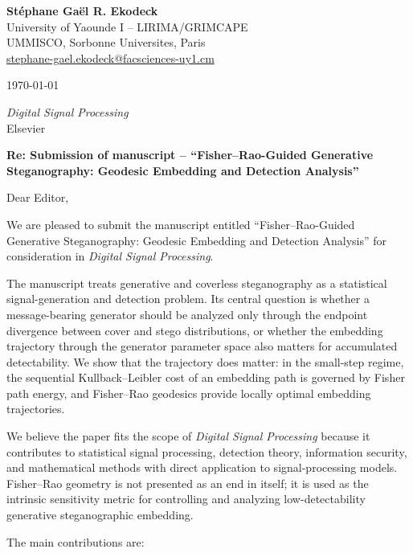\documentclass[12pt,a4paper]{article}
\begin{document}
\raggedright

\textbf{St\'ephane Ga\"el R. Ekodeck}\\
University of Yaounde I -- LIRIMA/GRIMCAPE\\
UMMISCO, Sorbonne Universites, Paris\\
\href{mailto:stephane-gael.ekodeck@facsciences-uy1.cm}
     {stephane-gael.ekodeck@facsciences-uy1.cm}

\bigskip
\today

\bigskip

\textit{Digital Signal Processing}\\
Elsevier

\bigskip

\textbf{Re: Submission of manuscript --
``Fisher--Rao-Guided Generative Steganography: Geodesic Embedding and Detection Analysis''}

\bigskip

Dear Editor,

We are pleased to submit the manuscript entitled
``Fisher--Rao-Guided Generative Steganography: Geodesic Embedding and
Detection Analysis'' for consideration in \textit{Digital Signal Processing}.

The manuscript treats generative and coverless steganography as a statistical
signal-generation and detection problem. Its central question is whether a
message-bearing generator should be analyzed only through the endpoint
divergence between cover and stego distributions, or whether the embedding
trajectory through the generator parameter space also matters for accumulated
detectability. We show that the trajectory does matter: in the small-step
regime, the sequential Kullback--Leibler cost of an embedding path is governed
by Fisher path energy, and Fisher--Rao geodesics provide locally optimal
embedding trajectories.

We believe the paper fits the scope of \textit{Digital Signal Processing}
because it contributes to statistical signal processing, detection theory,
information security, and mathematical methods with direct application to
signal-processing models. Fisher--Rao geometry is not presented as an end in
itself; it is used as the intrinsic sensitivity metric for controlling and
analyzing low-detectability generative steganographic embedding.

The main contributions are:
\end{document}
